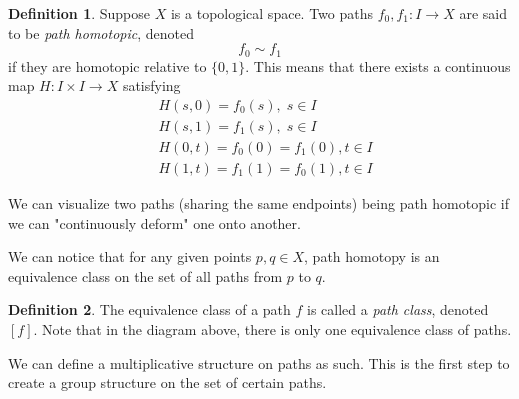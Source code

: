 \documentclass{article}
\theoremstyle{remark}
\theoremstyle{definition}
\newtheorem{definition}{Definition}[section]
\begin{document}
\begin{definition}
Suppose $X$ is a topological space. Two paths $f_0, f_1: I \longrightarrow X$ are said to be \textit{path homotopic}, denoted
\[f_0 \sim f_1\]
if they are homotopic relative to $\{0, 1\}$. This means that there exists a continuous map $H: I \times I \longrightarrow X$ satisfying
\begin{align*}
    &H(s, 0) = f_0 (s), \; s \in I \\
    &H(s, 1) = f_1 (s), \; s \in I \\
    &H(0, t) = f_0 (0) = f_1 (0), t \in I \\
    &H(1, t) = f_1 (1) = f_0 (1) , t \in I
\end{align*}
\end{definition}
We can visualize two paths (sharing the same endpoints) being path homotopic if we can "continuously deform" one onto another. 
\begin{center}
\end{center}
We can notice that for any given points $p, q \in X$, path homotopy is an equivalence class on the set of all paths from $p$ to $q$. 

\begin{definition}
The equivalence class of a path $f$ is called a \textit{path class}, denoted $[f]$. Note that in the diagram above, there is only one equivalence class of paths. 
\end{definition}

We can define a multiplicative structure on paths as such. This is the first step to create a group structure on the set of certain paths. 
\end{document}
